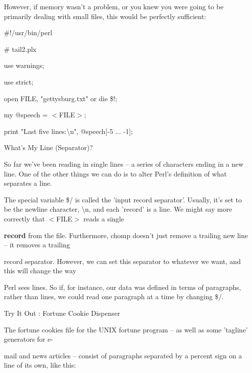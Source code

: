 \documentclass[a4paper,11pt]{book}
\begin{document}
\noindent 

\noindent However, if memory wasn't a problem, or you knew you were going to be primarily dealing with small files, this would be perfectly sufficient:

\noindent 

\noindent \#!/usr/bin/perl

\noindent \# tail2.plx

\noindent use warnings;

\noindent use strict;

\noindent 

\noindent open FILE, "gettysburg.txt" or die \$!;

\noindent my @speech = $<$FILE$>$;

\noindent 

\noindent print "Last five lines:\textbackslash n", @speech[-5 ... -1];

\noindent 

\noindent 

\noindent What's My Line (Separator)?

\noindent 

\noindent So far we've been reading in single lines -- a series of characters ending in a new line. One of the other things we can do is to alter Perl's definition of what separates a line.

\noindent 

\noindent The special variable \$/ is called the 'input record separator'. Usually, it's set to be the newline character, \textbackslash n, and each 'record' is a line. We might say more correctly that $<$FILE$>$ reads a single

\noindent \textbf{record }from the file. Furthermore, chomp doesn't just remove a trailing new line -- it removes a trailing

\noindent record separator. However, we can set this separator to whatever we want, and this will change the way

\noindent Perl sees lines. So if, for instance, our data was defined in terms of paragraphs, rather than lines, we could read one paragraph at a time by changing \$/.

\noindent 

\noindent Try It Out : Fortune Cookie Dispenser

\noindent The fortune cookies file for the UNIX fortune program -- as well as some 'tagline' generators for e-

\noindent mail and news articles -- consist of paragraphs separated by a percent sign on a line of its own, like this:
\end{document}
